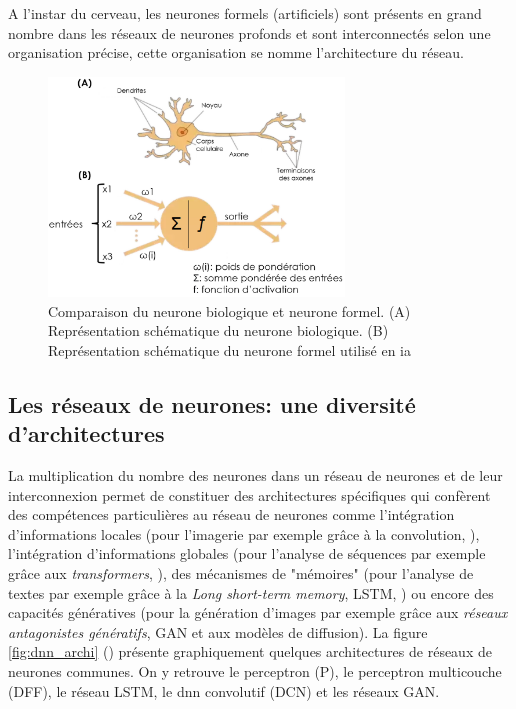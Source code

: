 A l'instar du cerveau, les neurones formels (artificiels) sont présents en grand nombre dans les réseaux de neurones profonds et sont interconnectés selon une organisation précise, cette organisation se nomme l'architecture du réseau.
\begin{figure}[!ht]
 \centering
 \includegraphics[width=0.7\textwidth]{figures/neuronne.png}
 \caption[Comparaison du neurone biologique et du neurone formel]{Comparaison du neurone biologique et neurone formel. (A) Représentation schématique du neurone biologique. (B) Représentation schématique du neurone formel utilisé en \gls{ia}}
 \label{fig:neurons}
\end{figure}
\subsection{Les réseaux de neurones: une diversité d'architectures}
La multiplication du nombre des neurones dans un réseau de neurones et de leur interconnexion permet de constituer des architectures spécifiques qui confèrent des compétences particulières au réseau de neurones comme l'intégration d'informations locales (pour l'imagerie par exemple grâce à la convolution, \cite{fukushima_neocognitron_1980}), l'intégration d'informations globales (pour l'analyse de séquences par exemple grâce aux \textit{transformers}, \cite{vaswani_attention_2017}), des mécanismes de "mémoires" (pour l'analyse de textes par exemple grâce à la \textit{Long short-term memory}, LSTM, \cite{hochreiter_long_1997}) ou encore des capacités génératives (pour la génération d'images par exemple grâce aux \textit{réseaux antagonistes génératifs}, GAN et aux modèles de diffusion). La figure \ref{fig:dnn_archi} (\cite{leijnen_neural_2016}) présente graphiquement quelques architectures de réseaux de neurones communes. On y retrouve le perceptron (P), le perceptron multicouche (DFF), le réseau LSTM, le \gls{dnn} convolutif (DCN) et les réseaux GAN.

